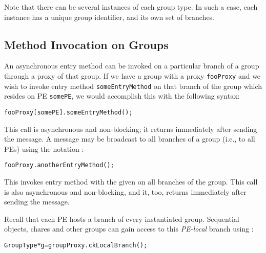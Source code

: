 
Note that there can be several instances of each group type.
In such a case, each instance has a unique group identifier, and its own set
of branches.

\subsection{Method Invocation on Groups}

An asynchronous entry method can be invoked on a particular branch of a
group through a proxy of that group. If we have a group with a proxy
{\tt fooProxy} and we wish to invoke entry method {\tt someEntryMethod} on
that branch of the group which resides on PE {\tt somePE}, we would accomplish
this with the following syntax:

\begin{alltt}
fooProxy[somePE].someEntryMethod();
\end{alltt}

This call is asynchronous and non-blocking; it returns immediately after sending the message.
A message may be broadcast  to all branches of a group
(i.e., to all PEs) using the notation :

\begin{alltt}
fooProxy.anotherEntryMethod();
\end{alltt}

This invokes entry method  with the given  on 
all branches of the group. This call is also asynchronous and non-blocking, and it, too, returns immediately
after sending the message.

Recall that each PE hosts a branch of every instantiated group. 
Sequential objects, chares and other groups can gain access to this {\em PE-local}
branch using :

\begin{alltt}
GroupType *g=groupProxy.ckLocalBranch();
\end{alltt}

